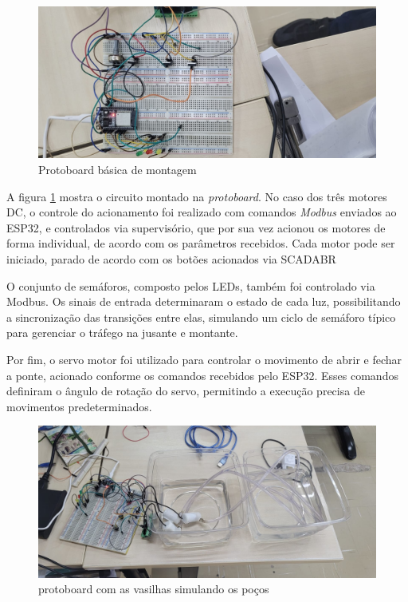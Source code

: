 \begin{figure}[h]
	\centering
	\label{fig:circuito_protoboard}
		\includegraphics[keepaspectratio=true,scale=0.2]{figuras/circuito.jpeg}
	\caption{Protoboard básica de montagem}
\end{figure}

A figura \ref{fig:circuito_protoboard} mostra o circuito montado na \textit{protoboard}. No caso dos três motores DC, o controle do acionamento foi realizado com comandos \textit{Modbus} enviados ao ESP32, e controlados via supervisório, que por sua vez acionou os motores de forma individual, de acordo com os parâmetros recebidos. Cada motor pode ser iniciado, parado de acordo com os botões acionados via SCADABR

O conjunto de semáforos, composto pelos LEDs, também foi controlado via Modbus. Os sinais de entrada determinaram o estado de cada luz, possibilitando a sincronização das transições entre elas, simulando um ciclo de semáforo típico para gerenciar o tráfego na jusante e montante.

Por fim, o servo motor foi utilizado para controlar o movimento de abrir e fechar a ponte, acionado conforme os comandos recebidos pelo ESP32. Esses comandos definiram o ângulo de rotação do servo, permitindo a execução precisa de movimentos predeterminados.


\begin{figure}[h]
	\centering
	\label{fig:vasilhas}
		\includegraphics[keepaspectratio=true,scale=0.2]{figuras/vaso_pocos.jpeg}
	\caption{protoboard com as vasilhas simulando os poços}
\end{figure}

